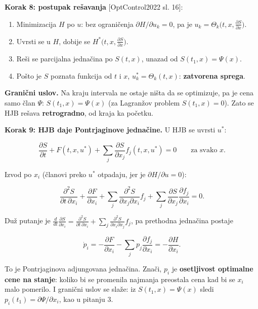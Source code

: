 \documentclass[11pt,a4paper,parskip=half,headsepline,numbers=noenddot]{scrartcl}
\DeclareRobustCommand{\izvor}[1]{{\small\color{izvorC}[#1]}}
\begin{document}
\textbf{Korak 8: postupak rešavanja} \izvor{OptControl2022 sl. 16}:

\begin{enumerate}
\def\labelenumi{\arabic{enumi}.}
\item Minimizacija \(H\) po \(u\): bez ograničenja \(\partial H/\partial u_k = 0\), pa je \(u_k = \Theta_k\big(t, x, \frac{\partial S}{\partial x}\big)\).
\item Uvrsti se u \(H\), dobije se \(H^*\big(t, x, \frac{\partial S}{\partial x}\big)\).
\item Reši se parcijalna jednačina po \(S(t, x)\), unazad od \(S(t_1, x) = \Psi(x)\).
\item Pošto je \(S\) poznata funkcija od \(t\) i \(x\), \(u_k^* = \Theta_k(t, x)\): \textbf{zatvorena sprega}.
\end{enumerate}

\textbf{Granični uslov.} Na kraju intervala ne ostaje ništa da se optimizuje, pa je cena samo član \(\Psi\): \(S(t_1, x) = \Psi(x)\) (za Lagranžov problem \(S(t_1, x) = 0\)). Zato se HJB rešava \textbf{retrogradno}, od kraja ka početku.

\textbf{Korak 9: HJB daje Pontrjaginove jednačine.} U HJB se uvrsti \(u^*\):

\[\frac{\partial S}{\partial t} + F(t, x, u^*) + \sum_j\frac{\partial S}{\partial x_j}f_j(t, x, u^*) = 0 \qquad\text{za svako } x .\]

Izvod po \(x_i\) (članovi preko \(u^*\) otpadaju, jer je \(\partial H/\partial u = 0\)):

\[\frac{\partial^2S}{\partial t\,\partial x_i} + \frac{\partial F}{\partial x_i} + \sum_j\frac{\partial^2S}{\partial x_j\partial x_i}f_j + \sum_j\frac{\partial S}{\partial x_j}\frac{\partial f_j}{\partial x_i} = 0 .\]

Duž putanje je \(\frac{d}{dt}\frac{\partial S}{\partial x_i} = \frac{\partial^2S}{\partial t\,\partial x_i} + \sum_j\frac{\partial^2S}{\partial x_i\partial x_j}f_j\), pa prethodna jednačina postaje

\[\dot p_i = -\frac{\partial F}{\partial x_i} - \sum_jp_j\frac{\partial f_j}{\partial x_i} = -\frac{\partial H}{\partial x_i} .\]

To je Pontrjaginova adjungovana jednačina. Znači, \(p_i\) je \textbf{osetljivost optimalne cene na stanje}: koliko bi se promenila najmanja preostala cena kad bi se \(x_i\) malo pomerilo. I granični uslov se slaže: iz \(S(t_1, x) = \Psi(x)\) sledi \(p_i(t_1) = \partial\Psi/\partial x_i\), kao u pitanju 3.
\end{document}

